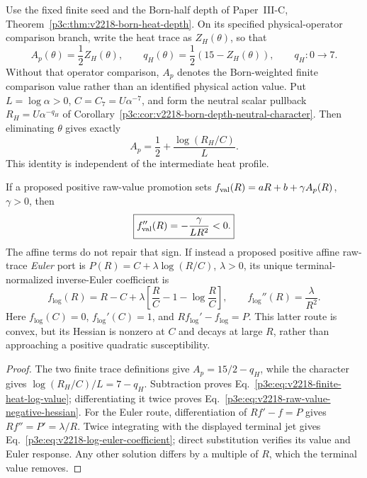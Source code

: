 \documentclass[12pt,a4paper]{article}
\begin{document}
\begin{proposition}
\label{p3e:prop:v2218-raw-heat-log-port}
Use the fixed finite seed and the Born-half depth of Paper~III-C,
Theorem~\ref{p3c:thm:v2218-born-heat-depth}.  On its specified
physical-operator comparison branch, write the heat trace as
\(Z_H(\theta)\), so that
\[
 A_p(\theta)=\frac12 Z_H(\theta),\qquad
 q_H(\theta)=\frac12(15-Z_H(\theta)),\qquad
 q_H:0\longrightarrow7.
\]
Without that operator comparison, \(A_p\) denotes the Born-weighted
finite comparison value rather than an identified physical action value.
Put \(L=\log\alpha>0\), \(C=C_7=U\alpha^{-7}\), and form the
neutral scalar pullback
\(R_H=U\alpha^{-q_H}\) of
Corollary~\ref{p3c:cor:v2218-born-depth-neutral-character}.
Then eliminating \(\theta\) gives exactly
\begin{equation}
 \label{p3e:eq:v2218-finite-heat-log-value}
 \boxed{A_p=\frac12+\frac{\log(R_H/C)}{L}.}
\end{equation}
This identity is independent of the intermediate heat profile.

If a proposed positive raw-value promotion sets
\(f_{\rm val}(R)=aR+b+\gamma A_p(R)\), \(\gamma>0\), then
\begin{equation}
 \label{p3e:eq:v2218-raw-value-negative-hessian}
 \boxed{f_{\rm val}''(R)=-\frac{\gamma}{LR^2}<0.}
\end{equation}
The affine terms do not repair that sign.  If instead a proposed
positive affine raw-trace \emph{Euler} port is
\(P(R)=C+\lambda\log(R/C)\), \(\lambda>0\), its unique
terminal-normalized inverse-Euler coefficient is
\begin{equation}
 \label{p3e:eq:v2218-log-euler-coefficient}
 \boxed{f_{\log}(R)=R-C+\lambda
 \left[\frac RC-1-\log\frac RC\right],\qquad
 f_{\log}''(R)=\frac{\lambda}{R^2}.}
\end{equation}
Here \(f_{\log}(C)=0\), \(f_{\log}'(C)=1\), and
\(Rf_{\log}'-f_{\log}=P\).  This latter route is convex, but its
Hessian is nonzero at \(C\) and decays at large \(R\), rather than
approaching a positive quadratic susceptibility.
\end{proposition}
\begin{proof}
The two finite trace definitions give
\(A_p=15/2-q_H\), while the character gives
\(\log(R_H/C)/L=7-q_H\).  Subtraction proves
Eq.~\eqref{p3e:eq:v2218-finite-heat-log-value}; differentiating it
twice proves Eq.~\eqref{p3e:eq:v2218-raw-value-negative-hessian}.
For the Euler route, differentiation of \(Rf'-f=P\) gives
\(Rf''=P'=\lambda/R\).  Twice integrating with the displayed
terminal jet gives Eq.~\eqref{p3e:eq:v2218-log-euler-coefficient};
direct substitution verifies its value and Euler response.  Any other
solution differs by a multiple of \(R\), which the terminal value
removes.
\end{proof}
\end{document}
